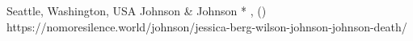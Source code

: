           {Seattle, Washington, USA}
          {}
          {Johnson \& Johnson}
          {*}
          {,
            ()}
          {https://nomoresilence.world/johnson/jessica-berg-wilson-johnson-johnson-death/}

